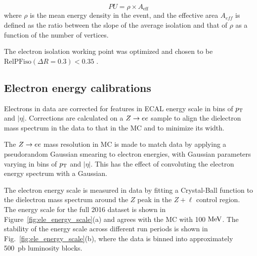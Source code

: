 \begin{equation}
 PU =  \rho \times A_\text{eff}
\label{eqn:purho}
\end{equation}
where $\rho$ is the mean energy density in the event, and the effective area $A_{eff}$ is defined as the ratio
between the slope of the average isolation and that of $\rho$ as a function of the number of vertices. 

The electron isolation working point was optimized and chosen to be $\text{RelPFiso}(\Delta R = 0.3) < 0.35$ \cite{AN-15-277}. 


\subsection{Electron energy calibrations}

Electrons in data are corrected for features in ECAL energy scale
in bins of $p_{\rm{T}}$ and $\left| \eta \right|$. Corrections are calculated
on a $Z \to ee$ sample to align the dielectron 
mass spectrum in the data to that in the MC and to
minimize its width.

The $Z \to ee$ mass resolution in MC is made to match
data by applying a pseudorandom Gaussian smearing to electron energies,
with Gaussian parameters varying in bins of $p_{\rm{T}}$ and $\left| \eta \right|$.
This has the effect of convoluting the electron energy spectrum with a
Gaussian.

The electron energy scale is measured in data by fitting a Crystal-Ball function to the dielectron mass spectrum around the $Z$ peak in the $Z+\ell$ control region. 
The energy scale for the full 2016 dataset is shown in Figure~\ref{fig:ele_energy_scale}(a) and agrees with the MC with 100 $\mathrm{Me\kern -0.1em V}$. 
The stability of the energy scale across different run periods is shown in Fig.~\ref{fig:ele_energy_scale}(b), where the data is binned into approximately 500~pb luminosity blocks.


